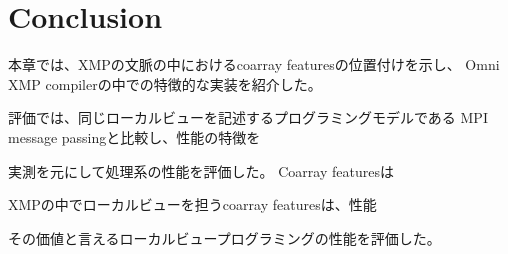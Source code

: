 \section{Conclusion}\label{sec:concl}

本章では、XMPの文脈の中におけるcoarray featuresの位置付けを示し、
Omni XMP compilerの中での特徴的な実装を紹介した。


評価では、同じローカルビューを記述するプログラミングモデルである
MPI message passingと比較し、性能の特徴を


実測を元にして処理系の性能を評価した。
Coarray featuresは

XMPの中でローカルビューを担うcoarray featuresは、性能

その価値と言えるローカルビュープログラミングの性能を評価した。

